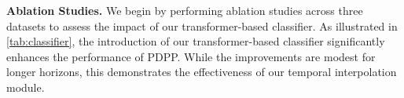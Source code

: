
\textbf{Ablation Studies.} We begin by performing ablation studies across three datasets to assess the impact of our transformer-based classifier. As illustrated in \cref{tab:classifier}, the introduction of our transformer-based classifier significantly enhances the performance of PDPP. While the improvements are modest for longer horizons, this demonstrates the effectiveness of our temporal interpolation module.










